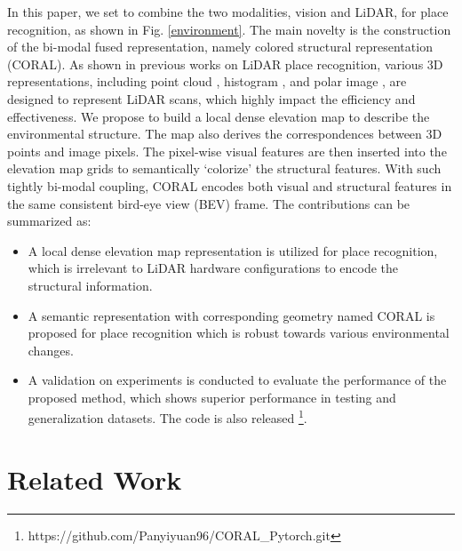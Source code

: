 \documentclass[letterpaper, 10 pt, conference]{ieeeconf}  \usepackage{tabularx}
\begin{document}
In this paper, we set to combine the two modalities, vision and LiDAR, for place recognition, as shown in Fig. \ref{environment}. The main novelty is the construction of the bi-modal fused representation, namely colored structural representation (CORAL). As shown in previous works on LiDAR place recognition, various 3D representations, including point cloud \cite{angelina2018pointnetvlad}, histogram \cite{yin2018locnet}, and polar image \cite{gkim-2019-ral,xu2020disco}, are designed to represent LiDAR scans, which highly impact the efficiency and effectiveness. We propose to build a local dense elevation map to describe the environmental structure. The map also derives the correspondences between 3D points and image pixels. The pixel-wise visual features are then inserted into the elevation map grids to semantically `colorize' the structural features. With such tightly bi-modal coupling, CORAL encodes both visual and structural features in the same consistent bird-eye view (BEV) frame. The contributions can be summarized as:
\begin{itemize}
\item A local dense elevation map representation is utilized for place recognition, which is irrelevant to LiDAR hardware configurations to encode the structural information.
\item A semantic representation with corresponding geometry named CORAL is proposed for place recognition which is robust towards various environmental changes.	
\item A validation on experiments is conducted to evaluate the performance of the proposed method, which shows superior performance in testing and generalization datasets. The code is also released \footnote[1]{https://github.com/Panyiyuan96/CORAL\_Pytorch.git}.
\end{itemize}





\section{Related Work}
\end{document}
